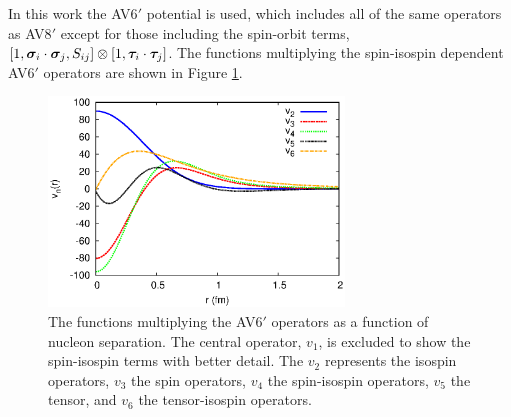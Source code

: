 In this work the AV6$'$ potential is used, which includes all of the same operators as AV8$'$ except for those including the spin-orbit terms, $\left[1,\bm{\sigma}_i\cdot\bm{\sigma}_j,S_{ij}\right]\otimes\left[1,\bm{\tau}_i\cdot\bm{\tau}_j\right]$. The functions multiplying the spin-isospin dependent AV6$'$ operators are shown in Figure \ref{fig:vij}.
\begin{figure}[h!]
   \centering
   \includegraphics[width=0.7\textwidth]{figures/vij.eps}
   \caption{The functions multiplying the AV6$'$ operators as a function of nucleon separation. The central operator, $v_1$, is excluded to show the spin-isospin terms with better detail. The $v_2$ represents the isospin operators, $v_3$ the spin operators, $v_4$ the spin-isospin operators, $v_5$ the tensor, and $v_6$ the tensor-isospin operators.}
   \label{fig:vij}
\end{figure}

